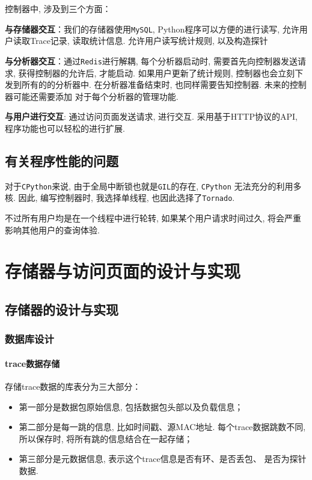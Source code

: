 控制器中, 涉及到三个方面：

\textbf{与存储器交互}：我们的存储器使用\texttt{MySQL},
Python程序可以方便的进行读写, 允许用户读取Trace记录, 读取统计信息.
允许用户读写统计规则, 以及构造探针

\textbf{与分析器交互}：通过\texttt{Redis}\cite{redis}进行解耦, 每个分析器启动时,
需要首先向控制器发送请求, 获得控制器的允许后, 才能启动.
如果用户更新了统计规则, 控制器也会立刻下发到所有的的分析器中.
在分析器准备结束时, 也同样需要告知控制器. 未来的控制器可能还需要添加
对于每个分析器的管理功能.

\textbf{与用户进行交互}: 通过访问页面发送请求, 进行交互. 采用基于HTTP协议的API,
程序功能也可以轻松的进行扩展.


\section{有关程序性能的问题}

  对于\texttt{CPython}来说, 由于全局中断锁也就是\texttt{GIL}的存在, \texttt{CPython}
无法充分的利用多核. 因此, 编写控制器时, 我选择单线程, 也因此选择了\texttt{Tornado}.

 不过所有用户均是在一个线程中进行轮转, 如果某个用户请求时间过久,
将会严重影响其他用户的查询体验.

\chapter{存储器与访问页面的设计与实现}

\section{存储器的设计与实现}

\subsection{数据库设计}
\label{sec:数据库设计}

\subsubsection{trace数据存储}

存储trace数据的库表分为三大部分：

\begin{itemize}
    \setlength\itemsep{0.1em}
    \item 第一部分是数据包原始信息, 包括数据包头部以及负载信息；
    \item 第二部分是每一跳的信息, 比如时间戳、源MAC地址. 每个trace数据跳数不同,
            所以保存时, 将所有跳的信息结合在一起存储；
    \item 第三部分是元数据信息, 表示这个trace信息是否有环、是否丢包、
            是否为探针数据.
\end{itemize}


